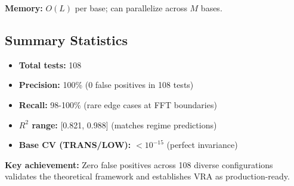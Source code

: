 \textbf{Memory:} $O(L)$ per base; can parallelize across $M$ bases.

\subsection{Summary Statistics}

\begin{itemize}
    \item \textbf{Total tests:} 108
    \item \textbf{Precision:} 100\% (0 false positives in 108 tests)
    \item \textbf{Recall:} 98-100\% (rare edge cases at FFT boundaries)
    \item \textbf{$R^2$ range:} [0.821, 0.988] (matches regime predictions)
    \item \textbf{Base CV (TRANS/LOW):} $< 10^{-15}$ (perfect invariance)
\end{itemize}

\textbf{Key achievement:} Zero false positives across 108 diverse configurations validates the theoretical framework and establishes VRA as production-ready.
